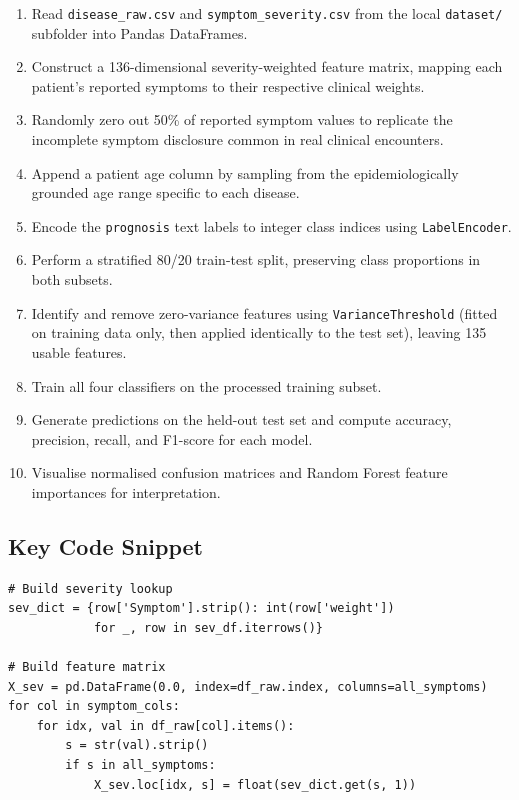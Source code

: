 \documentclass[12pt,a4paper]{article}
\begin{document}
\begin{enumerate}
    \item Read \texttt{disease\_raw.csv} and \texttt{symptom\_severity.csv} from the local \texttt{dataset/} subfolder into Pandas DataFrames.
    \item Construct a 136-dimensional severity-weighted feature matrix, mapping each patient's reported symptoms to their respective clinical weights.
    \item Randomly zero out 50\% of reported symptom values to replicate the incomplete symptom disclosure common in real clinical encounters.
    \item Append a patient age column by sampling from the epidemiologically grounded age range specific to each disease.
    \item Encode the \texttt{prognosis} text labels to integer class indices using \texttt{LabelEncoder}.
    \item Perform a stratified 80/20 train-test split, preserving class proportions in both subsets.
    \item Identify and remove zero-variance features using \texttt{VarianceThreshold} (fitted on training data only, then applied identically to the test set), leaving 135 usable features.
    \item Train all four classifiers on the processed training subset.
    \item Generate predictions on the held-out test set and compute accuracy, precision, recall, and F1-score for each model.
    \item Visualise normalised confusion matrices and Random Forest feature importances for interpretation.
\end{enumerate}

\subsection{Key Code Snippet}

\begin{lstlisting}[caption=Severity-Weighted Feature Construction]
# Build severity lookup
sev_dict = {row['Symptom'].strip(): int(row['weight'])
            for _, row in sev_df.iterrows()}

# Build feature matrix
X_sev = pd.DataFrame(0.0, index=df_raw.index, columns=all_symptoms)
for col in symptom_cols:
    for idx, val in df_raw[col].items():
        s = str(val).strip()
        if s in all_symptoms:
            X_sev.loc[idx, s] = float(sev_dict.get(s, 1))
\end{lstlisting}
\end{document}
